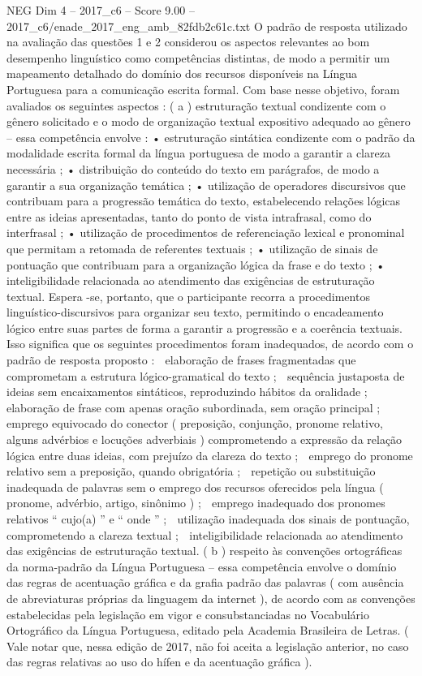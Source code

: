 \begin{textsample}{NEG Dim 4 – 2017\_c6 – Score 9.00 – 2017\_c6/enade\_2017\_eng\_amb\_82fdb2c61c.txt}
O padrão de resposta utilizado na avaliação das questões 1 e 2 considerou os aspectos relevantes ao bom desempenho linguístico como competências distintas, de modo a permitir um mapeamento detalhado do domínio dos recursos disponíveis na Língua Portuguesa para a comunicação escrita formal.
Com base nesse objetivo, foram avaliados os seguintes aspectos : ( a ) estruturação textual condizente com o gênero solicitado e o modo de organização textual expositivo adequado ao gênero – essa competência envolve : • estruturação sintática condizente com o padrão da modalidade escrita formal da língua portuguesa de modo a garantir a clareza necessária ; • distribuição do conteúdo do texto em parágrafos, de modo a garantir a sua organização temática ; • utilização de operadores discursivos que contribuam para a progressão temática do texto, estabelecendo relações lógicas entre as ideias apresentadas, tanto do ponto de vista intrafrasal, como do interfrasal ; • utilização de procedimentos de referenciação lexical e pronominal que permitam a retomada de referentes textuais ; • utilização de sinais de pontuação que contribuam para a organização lógica da frase e do texto ; • inteligibilidade relacionada ao atendimento das exigências de estruturação textual.
Espera -se, portanto, que o participante recorra a procedimentos linguístico-discursivos para organizar seu texto, permitindo o encadeamento lógico entre suas partes de forma a garantir a progressão e a coerência textuais.
Isso significa que os seguintes procedimentos foram inadequados, de acordo com o padrão de resposta proposto :  elaboração de frases fragmentadas que comprometam a estrutura lógico-gramatical do texto ;  sequência justaposta de ideias sem encaixamentos sintáticos, reproduzindo hábitos da oralidade ;  elaboração de frase com apenas oração subordinada, sem oração principal ;  emprego equivocado do conector ( preposição, conjunção, pronome relativo, alguns advérbios e locuções adverbiais ) comprometendo a expressão da relação lógica entre duas ideias, com prejuízo da clareza do texto ;  emprego do pronome relativo sem a preposição, quando obrigatória ;  repetição ou substituição inadequada de palavras sem o emprego dos recursos oferecidos pela língua ( pronome, advérbio, artigo, sinônimo ) ;  emprego inadequado dos pronomes relativos “ cujo(a) ” e “ onde ” ;  utilização inadequada dos sinais de pontuação, comprometendo a clareza textual ;  inteligibilidade relacionada ao atendimento das exigências de estruturação textual. ( b ) respeito às convenções ortográficas da norma-padrão da Língua Portuguesa – essa competência envolve o domínio das regras de acentuação gráfica e da grafia padrão das palavras ( com ausência de abreviaturas próprias da linguagem da internet ), de acordo com as convenções estabelecidas pela legislação em vigor e consubstanciadas no Vocabulário Ortográfico da Língua Portuguesa, editado pela Academia Brasileira de Letras. ( Vale notar que, nessa edição de 2017, não foi aceita a legislação anterior, no caso das regras relativas ao uso do hífen e da acentuação gráfica ).

\end{textsample}
